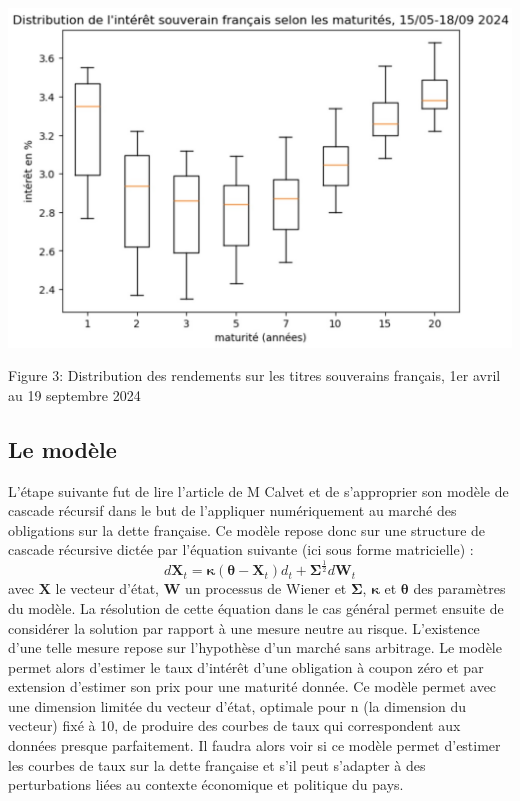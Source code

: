 \documentclass[a4paper]{article}
\begin{document}
\begin{center}


\includegraphics[scale=0.29]{distribution.jpg}

Figure 3: Distribution des rendements sur les titres souverains français, 1er avril au 19 septembre 2024

\end{center}


\subsection{Le modèle}



L’étape suivante fut de lire l'article de M Calvet et de s'approprier son modèle de cascade récursif dans le but de l'appliquer numériquement au marché des obligations sur la dette française. Ce modèle repose donc sur une structure de cascade récursive dictée par l'équation suivante (ici sous forme matricielle) :
$$ d\boldsymbol{X}_t = \boldsymbol\kappa (\boldsymbol\theta - \boldsymbol{X}_t)d_t + \boldsymbol\Sigma^{\frac{1}{2}} d\boldsymbol{W}_t$$
avec $\boldsymbol{X}$ le vecteur d’état, $\boldsymbol{W}$ un processus de Wiener et $\boldsymbol\Sigma$, $\boldsymbol\kappa$ et $\boldsymbol\theta$ des paramètres du modèle. La résolution de cette équation dans le cas général permet ensuite de considérer la solution par rapport à une mesure neutre au risque. L'existence d'une telle mesure repose sur l'hypothèse d'un marché sans arbitrage. Le modèle permet alors d'estimer le taux d'intérêt d'une obligation à coupon zéro et par extension d'estimer son prix pour une maturité donnée. Ce modèle permet avec une dimension limitée du vecteur d’état, optimale pour n (la dimension du vecteur) fixé à 10, de produire des courbes de taux qui correspondent aux données presque parfaitement. Il faudra alors voir si ce modèle permet d'estimer les courbes de taux sur la dette française et s’il peut s'adapter à des perturbations liées au contexte économique et politique du pays.
\end{document}
